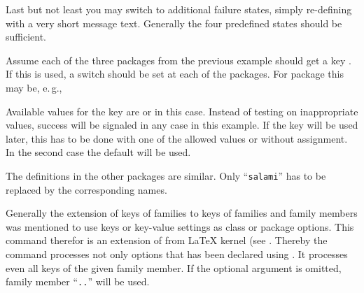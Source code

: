 Last but not least you may switch to additional failure states, simply
re-defining  with a very short message
text. Generally the four predefined states should be sufficient.

\begin{Example}
  Assume each of the three packages from the previous example should get a
  key . If this is used, a switch should be set at each of
  the packages. For package  this may be, e.\,g.,
  Available values for the key are  or  in this
  case. Instead of testing on inappropriate values, success will be signaled
  in any case in this example. If the key will be used later, this has to be
  done with one of the allowed values or without assignment. In the second
  case the default  will be used.

  The definitions in the other packages are similar. Only ``\texttt{salami}''
  has to be replaced by the corresponding names.
\end{Example}
%
%
%
%
%
%
%


\begin{Declaration}
\end{Declaration}
%
Generally the extension of keys of families to keys of families and family
members was mentioned to use keys or key-value settings as class or package
options. This command therefor is an extension of  from
\LaTeX{} kernel (see \cite{latex:clsguide}. Thereby the command processes not
only options that has been declared using . It processes
even all keys of the given family member. If the optional argument
 is omitted, family member
``\texttt{.}\texttt{.}'' will be used.

